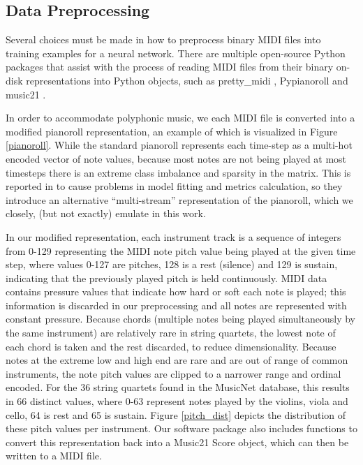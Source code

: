 \documentclass[sigconf,authorversion]{acmart}
\begin{document}
\subsection{Data Preprocessing}

Several choices must be made in how to preprocess binary MIDI files
into training examples for a neural network. There are multiple
open-source Python packages that assist with the process of reading
MIDI files from their binary on-disk representations into Python
objects, such as pretty\_midi \cite{raffel_pretty_midi_2014},
Pypianoroll \cite{dong_pypianoroll_2018} and music21
\cite{cuthbert_music21_2010}.

In order to accommodate polyphonic music, we each MIDI file is
converted into a modified pianoroll representation, an example of
which is visualized in Figure \ref{pianoroll}. While the standard
pianoroll represents each time-step as a multi-hot encoded vector of
note values, because most notes are not being played at most timesteps
there is an extreme class imbalance and sparsity in the matrix. This
is reported in \cite{kumar2019polyphonic} to cause problems in model
fitting and metrics calculation, so they introduce an alternative
``multi-stream'' representation of the pianoroll, which we closely,
(but not exactly) emulate in this work.

In our modified representation, each instrument track is a sequence of
integers from 0-129 representing the MIDI note pitch value being
played at the given time step, where values 0-127 are pitches, 128 is
a rest (silence) and 129 is sustain, indicating that the previously
played pitch is held continuously. MIDI data contains pressure values
that indicate how hard or soft each note is played; this information
is discarded in our preprocessing and all notes are represented with
constant pressure. Because chords (multiple notes being played
simultaneously by the same instrument) are relatively rare in string
quartets, the lowest note of each chord is taken and the rest
discarded, to reduce dimensionality. Because notes at the extreme low
and high end are rare and are out of range of common instruments, the
note pitch values are clipped to a narrower range and ordinal
encoded. For the 36 string quartets found in the MusicNet database,
this results in 66 distinct values, where 0-63 represent notes played
by the violins, viola and cello, 64 is rest and 65 is sustain. Figure
\ref{pitch_dist} depicts the distribution of these pitch values per
instrument. Our software package also includes functions to convert
this representation back into a Music21 Score object, which can then
be written to a MIDI file.
\end{document}
